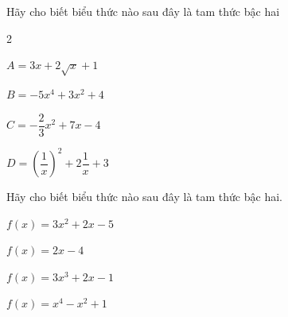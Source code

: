
\begin{bt}%
	Hãy cho biết biểu thức nào sau đây là tam thức bậc hai
	\begin{enumEX}{2}
		\item $A=3x+2\sqrt{x}+1$
		\item $B=-5x^4+3x^2+4$
		\item $C=-\dfrac{2}{3}x^2+7x-4$
		\item $D=\left(\dfrac{1}{x}\right)^2+2\dfrac{1}{x}+3$
	\end{enumEX}
\end{bt}

\begin{bt}%
	Hãy cho biết biểu thức nào sau đây là tam thức bậc hai.
	\begin{listEX}[2]
		\item $f(x)=3x^2+2x-5$
		\item $f(x)=2x-4$
		\item $f(x)=3x^3+2x-1$
		\item $f(x)=x^4-x^2+1$
	\end{listEX}
\end{bt}


